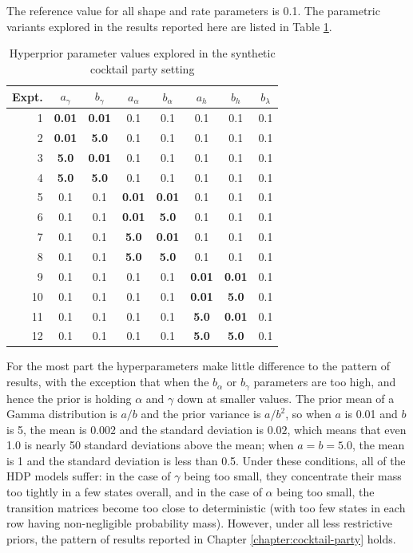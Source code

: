 The reference value for all shape and rate parameters is 0.1.  The
parametric variants explored in the results reported here are listed
in Table \ref{tab:cocktail-param-values}.

\begin{table}
  \centering
  \begin{tabular}{|r|c|c|c|c|c|c|c|} \hline
    Expt. & $a_\gamma$ & $b_{\gamma}$ & $a_\alpha$ & $b_{\alpha}$ & $a_h$ &
    $b_h$ & $b_\lambda$ \\ \hline
    1 & {\bf 0.01} & {\bf 0.01} & 0.1 & 0.1 & 0.1 & 0.1 & 0.1 \\
    2 & {\bf 0.01} & {\bf 5.0} & 0.1 & 0.1 & 0.1 & 0.1 & 0.1 \\
    3 & {\bf 5.0} & {\bf 0.01} & 0.1 & 0.1 & 0.1 & 0.1 & 0.1 \\
    4 & {\bf 5.0} & {\bf 5.0} & 0.1 & 0.1 & 0.1 & 0.1 & 0.1 \\
    5 & 0.1 & 0.1 & {\bf 0.01} & {\bf 0.01} & 0.1 & 0.1 & 0.1 \\
    6 & 0.1 & 0.1 & {\bf 0.01} & {\bf 5.0} & 0.1 & 0.1 & 0.1 \\
    7 & 0.1 & 0.1 & {\bf 5.0} & {\bf 0.01} & 0.1 & 0.1 & 0.1 \\
    8 & 0.1 & 0.1 & {\bf 5.0} & {\bf 5.0} & 0.1 & 0.1 & 0.1 \\
    9 & 0.1 & 0.1 & 0.1 & 0.1 & {\bf 0.01} & {\bf 0.01} & 0.1 \\
    10 & 0.1 & 0.1 & 0.1 & 0.1 & {\bf 0.01} & {\bf 5.0} & 0.1 \\
    11 & 0.1 & 0.1 & 0.1 & 0.1 & {\bf 5.0} & {\bf 0.01} & 0.1 \\
    12 & 0.1 & 0.1 & 0.1 & 0.1 & {\bf 5.0} & {\bf 5.0} & 0.1 \\ \hline
  \end{tabular}
  \caption{Hyperprior parameter values explored in the synthetic
    cocktail party setting}
  \label{tab:cocktail-param-values}
\end{table}

For the most part the hyperparameters make little difference to the
pattern of results, with the exception that when the $b_\alpha$ or
$b_{\gamma}$ parameters are too high, and hence the prior is holding
$\alpha$ and $\gamma$ down at smaller values.  The prior mean of a
Gamma distribution is $a/b$
and the prior variance is $a/b^2$, so when $a$ is 0.01 and $b$ is 5,
the mean is $0.002$ and the standard deviation is $0.02$, which means
that even 1.0 is nearly 50 standard deviations above the mean; when $a
= b = 5.0$, the mean is 1 and the standard deviation is less than
0.5.  Under these conditions, all of the HDP models suffer: in the
case of $\gamma$ being too small, they
concentrate their mass too tightly in a few states overall, and in the
case of $\alpha$ being too small, the transition matrices become too
close to deterministic (with too few states in each row having
non-negligible probability mass).  
However, under all less restrictive priors, the pattern of results
reported in Chapter \ref{chapter:cocktail-party} holds.

